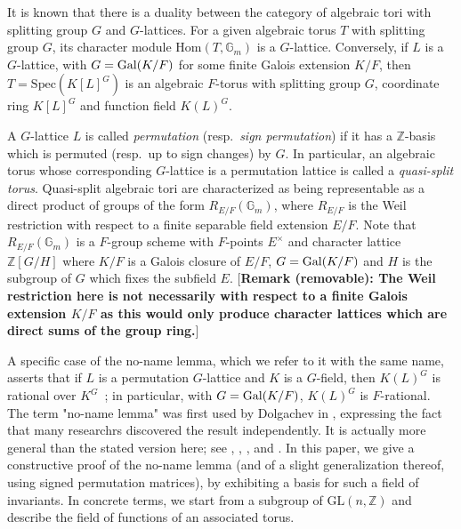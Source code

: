 \documentclass[12pt]{article}
\theoremstyle{plain}
\newcommand{\Z}{\ensuremath{\mathbb{Z}}}
\begin{document}
It is known that there is a duality between the category of algebraic
tori with splitting group $G$ and $G$-lattices. For a given algebraic
torus $T$ with splitting group $G$, its character module
$\mathrm{Hom}(T,\mathbb{G}_m)$ is a $G$-lattice. Conversely, if $L$ is
a $G$-lattice, with $G={\rm Gal}(K/F)$ for some finite Galois
extension $K/F$, then $T=\mathrm{Spec}(K[L]^G)$ is an algebraic
$F$-torus with splitting group $G$, coordinate ring $K[L]^G$ and
function field $K(L)^G$.

A $G$-lattice $L$ is called {\em permutation} (resp.\ {\em sign
  permutation}) if it has a $\Z$-basis which is permuted (resp.\ up to
sign changes) by $G$. In particular, an algebraic torus whose
corresponding $G$-lattice is a permutation lattice is called a {\em
  quasi-split torus}. Quasi-split algebraic tori 
  are characterized as being
representable as a direct product of groups of the form
$R_{E/F}(\mathbb{G}_m)$, where $R_{E/F}$ is the Weil restriction with 
respect to a finite separable field extension $E/F$.
Note that $R_{E/F}(\mathbb{G}_m)$ is a $F$-group scheme with $F$-points $E^{\times}$ and 
character lattice $\Z[G/H]$ where $K/F$ is a Galois closure of $E/F$, $G={\rm Gal}(K/F)$ and $H$ is the 
subgroup of $G$ which fixes the subfield $E$.
[\textbf{Remark (removable): The Weil restriction here is not necessarily with respect to a finite Galois extension $K/F$
as this would only produce character lattices which are direct sums of the group ring.}]

A specific case of the no-name lemma, which we refer to it with the same name, 
asserts that if $L$ is a permutation $G$-lattice and
$K$ is a $G$-field, then $K(L)^G$ is rational over
$K^G$~\cite[Chapter~9.4]{Lorenz}; in particular, with $G={\rm
  Gal}(K/F)$, $K(L)^G$ is $F$-rational. The term "no-name lemma" was first used 
by Dolgachev in \cite{Dolgachev}, expressing the fact that many researchrs 
discovered the result independently. It is actually more general than the stated 
version here; see \cite[p. 6]{Dolgachev}, \cite[Section 3.2]{Sansuc}, \cite[Proposition 1.3]{Lenstra}, \cite[Remark 2.4]{Domokos} and \cite[Proposition 1.1]{EndoMiyata}.  In this paper, we give a
constructive proof of  the no-name lemma (and of a slight generalization
thereof, using signed permutation matrices), by exhibiting a basis for
such a field of invariants.  In concrete terms, we start from a
subgroup of $\mathrm{GL}(n,\Z)$ and describe the field of functions of
an associated torus.
\end{document}
